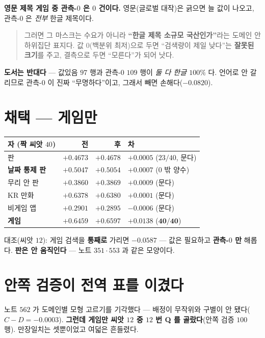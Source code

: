 \documentclass[11pt]{article}
\begin{document}
\textbf{영문 제목 게임 중 관측-$0$ 은 $0$ 건이다.} 영문(글로벌 대작)은
긁으면 늘 값이 나오고, 관측-$0$ 은 \emph{전부} 한글 제목이다.

\begin{quote}
그러면 그 마스크는 수요가 아니라 \textbf{``한글 제목 소규모 국산인가''}라는
도메인 안 하위집단 표지다. 값 $0$(백분위 최저)으로 두면 ``검색량이 제일
낮다''는 \textbf{잘못된 크기}를 주고, 결측으로 두면 ``모른다''가 되어 낫다.
\end{quote}

\textbf{도서는 반대다} --- 값있음 $97$ 행과 관측-$0$ $109$ 행이 \emph{둘 다
한글 $100\%$} 다. 언어로 안 갈리므로 관측-$0$ 이 진짜 ``무명하다''이고,
그래서 빼면 손해다($-0.0820$).

\section{채택 --- 게임만}

\begin{center}
\begin{tabular}{lrrl}
\hline
자 (짝 씨앗 $40$) & 전 & 후 & 차 \\
\hline
판 & $+0.4673$ & $+0.4678$ & $+0.0005$ ($23/40$, 문다) \\
\textbf{날짜 통제 판} & $+0.5047$ & $+0.5054$ & $\mathbf{+0.0007}$ ($0$ 밖 양수) \\
무리 안 판 & $+0.3860$ & $+0.3869$ & $+0.0009$ (문다) \\
KR 만화 & $+0.6378$ & $+0.6380$ & $+0.0001$ (문다) \\
비게임 앱 & $+0.2901$ & $+0.2895$ & $-0.0006$ (문다) \\
\hline
\textbf{게임} & $+0.6459$ & $+0.6597$ & $\mathbf{+0.0138}$ ($\mathbf{40/40}$) \\
\hline
\end{tabular}
\end{center}

대조(씨앗 $12$): 게임 검색을 \textbf{통째로} 가리면 $-0.0587$ --- 값은
필요하고 \textbf{관측-$0$ 만} 해롭다. \textbf{판은 안 움직인다} --- 노트
$351 \cdot 553$ 과 같은 모양이다.

\section{안쪽 검증이 전역 표를 이겼다}

노트 $562$ 가 도메인별 모형 고르기를 기각했다 --- 배정이 무작위와 구별이
안 됐다($C-D = -0.0003$). \textbf{그런데 게임만 씨앗 $12$ 중 $12$ 번 Q 를
골랐다}(안쪽 검증 $100$ 행). 만장일치는 셋뿐이었고 여덟은 흔들렸다.
\end{document}

